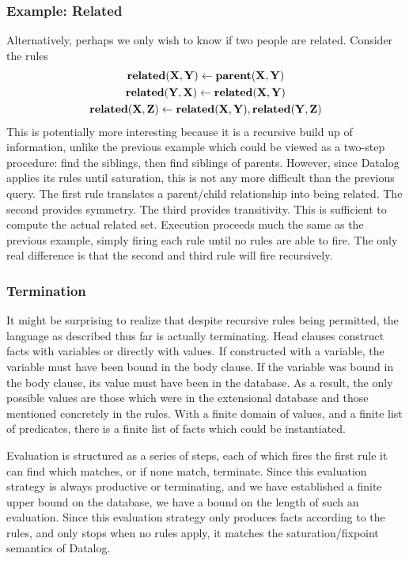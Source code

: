 \subsubsection{Example: Related}
Alternatively, perhaps we only wish to know if two people are related.
Consider the rules
\begin{gather*}
        {\bf related}({\bf X}, {\bf Y}) \leftarrow {\bf parent}({\bf X}, {\bf Y})\\
        {\bf related}({\bf Y}, {\bf X}) \leftarrow {\bf related}({\bf X}, {\bf Y})\\
        {\bf related}({\bf X}, {\bf Z}) \leftarrow {\bf related}({\bf X}, {\bf Y}), {\bf related}({\bf Y}, {\bf Z})
\end{gather*}
This is potentially more interesting because it is a recursive build up of information, unlike the previous example which could be viewed as a two-step procedure: find the siblings, then find siblings of parents.
However, since Datalog applies its rules until saturation, this is not any more difficult than the previous query.
The first rule translates a parent/child relationship into being related.
The second provides symmetry.
The third provides transitivity.
This is sufficient to compute the actual related set.
Execution proceeds much the same as the previous example, simply firing each rule until no rules are able to fire.
The only real difference is that the second and third rule will fire recursively.
\subsubsection{Termination}
It might be surprising to realize that despite recursive rules being permitted, the language as described thus far is actually terminating.
Head clauses construct facts with variables or directly with values.
If constructed with a variable, the variable must have been bound in the body clause.
If the variable was bound in the body clause, its value must have been in the database.
As a result, the only possible values are those which were in the extensional database and those mentioned concretely in the rules.
With a finite domain of values, and a finite list of predicates, there is a finite list of facts which could be instantiated.

Evaluation is structured as a series of steps, each of which fires the first rule it can find which matches, or if none match, terminate.
Since this evaluation strategy is always productive or terminating, and we have established a finite upper bound on the database, we have a bound on the length of such an evaluation.
Since this evaluation strategy only produces facts according to the rules, and only stops when no rules apply, it matches the saturation/fixpoint semantics of Datalog.

